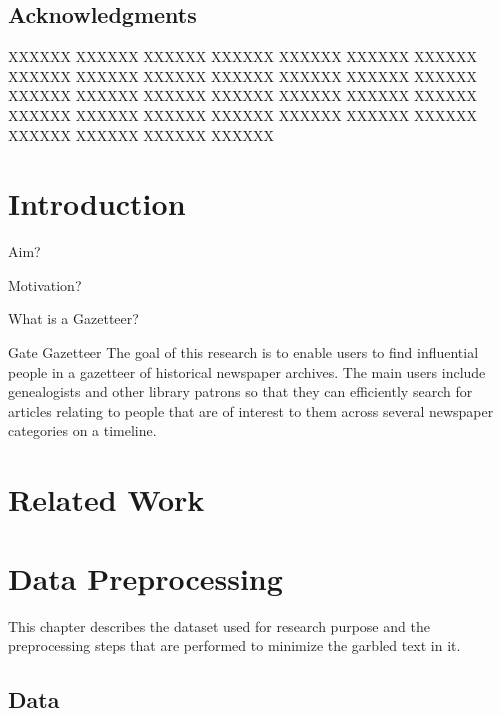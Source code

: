 \documentclass[letterpaper,11pt]{report}
\begin{document}
\newpage
\pagestyle{empty}


\newpage



\section*{Acknowledgments}\label{section:acknowledgments}
\pagestyle{plain}

XXXXXX XXXXXX XXXXXX XXXXXX XXXXXX XXXXXX XXXXXX XXXXXX XXXXXX XXXXXX XXXXXX XXXXXX XXXXXX XXXXXX XXXXXX XXXXXX XXXXXX XXXXXX XXXXXX XXXXXX XXXXXX XXXXXX XXXXXX XXXXXX XXXXXX XXXXXX XXXXXX XXXXXX XXXXXX XXXXXX XXXXXX XXXXXX 

\newpage

\tableofcontents
\listoffigures 
\listoftables

\newpage

\newpage

\newpage
\mbox{}



\chapter{Introduction}\label{chapter:introduction}
\setcounter{page}{1}
\onehalfspacing

Aim?

Motivation? 

What is a Gazetteer?

Gate Gazetteer
The goal of this research is to enable users to find influential people in a gazetteer of historical newspaper archives. The main users  include genealogists and other library patrons so that  they can efficiently search for articles relating to people that are of interest to them across several newspaper categories on a timeline.


\chapter{Related Work}
\chapter{Data Preprocessing}\label{chapter:data preprocessing} 

 
This chapter describes the dataset used for research purpose and the preprocessing steps that are performed to minimize the garbled text in it.
 
\section{Data}
\end{document}
